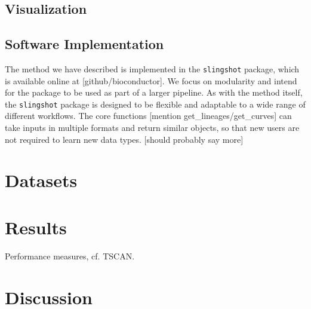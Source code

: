 \documentclass[11pt]{article}\usepackage[]{graphicx}\usepackage[]{color}
\begin{document}
\subsection{Visualization}


\subsection{Software Implementation}
The method we have described is implemented in the \texttt{slingshot} package, which is available online at [github/bioconductor]. We focus on modularity and intend for the package to be used as part of a larger pipeline. As with the method itself, the \texttt{slingshot} package is designed to be flexible and adaptable to a wide range of different workflows. The core functions [mention get\_lineages/get\_curves] can take inputs in multiple formats and return similar objects, so that new users are not required to learn new data types. [should probably say more]

\section{Datasets}

\section{Results}
Performance measures, cf. TSCAN.

\section{Discussion}
\end{document}
